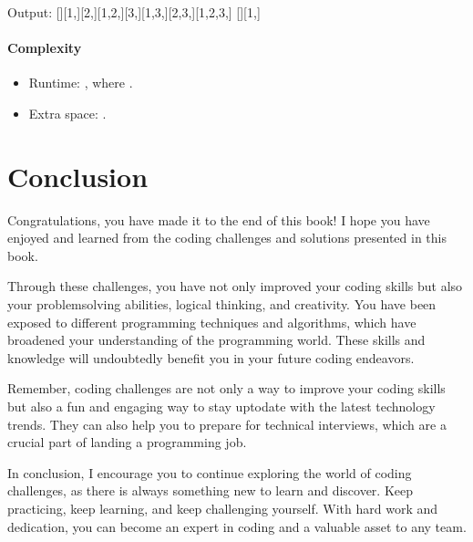 \documentclass[letterpaper,12pt,english]{book}
\begin{document}
\begin{sphinxVerbatim}[commandchars=\\\{\}]
Output:
[][1,][2,][1,2,][3,][1,3,][2,3,][1,2,3,]
[][1,]
\end{sphinxVerbatim}


\subsubsection{Complexity}
\label{\detokenize{Mathematics/09_MTH_78_Subsets:complexity}}\begin{itemize}
\item {} 
\sphinxAtStartPar
Runtime: , where .

\item {} 
\sphinxAtStartPar
Extra space: .

\end{itemize}

\sphinxstepscope


\chapter{Conclusion}
\label{\detokenize{conclude:conclusion}}\label{\detokenize{conclude::doc}}
\sphinxAtStartPar
Congratulations, you have made it to the end of this book! I hope you have enjoyed and learned from the coding challenges and solutions presented in this book.

\sphinxAtStartPar
Through these challenges, you have not only improved your coding skills but also your problem\sphinxhyphen{}solving abilities, logical thinking, and creativity. You have been exposed to different programming techniques and algorithms, which have broadened your understanding of the programming world. These skills and knowledge will undoubtedly benefit you in your future coding endeavors.

\sphinxAtStartPar
Remember, coding challenges are not only a way to improve your coding skills but also a fun and engaging way to stay up\sphinxhyphen{}to\sphinxhyphen{}date with the latest technology trends. They can also help you to prepare for technical interviews, which are a crucial part of landing a programming job.

\sphinxAtStartPar
In conclusion, I encourage you to continue exploring the world of coding challenges, as there is always something new to learn and discover. Keep practicing, keep learning, and keep challenging yourself. With hard work and dedication, you can become an expert in coding and a valuable asset to any team.
\end{document}
